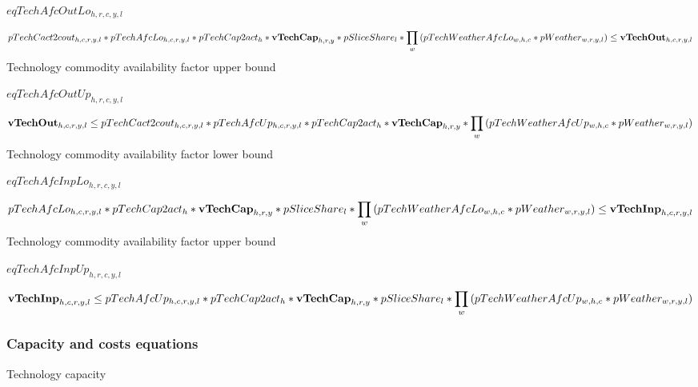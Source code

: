 \documentclass{article}
\begin{document}
$eqTechAfcOutLo_{h,r,c,y,l}$





\begin{dmath} 
pTechCact2cout_{h,c,r,y,l}*pTechAfcLo_{h,c,r,y,l}*pTechCap2act_{h}*{\bf vTechCap}_{h,r,y}*pSliceShare_{l}*\prod_{w}{\left(pTechWeatherAfcLo_{w,h,c}*pWeather_{w,r,y,l}\right)}  \le  {\bf vTechOut}_{h,c,r,y,l}
\end{dmath} 
Technology commodity availability factor upper bound







$eqTechAfcOutUp_{h,r,c,y,l}$





\begin{dmath} 
{\bf vTechOut}_{h,c,r,y,l}  \le  pTechCact2cout_{h,c,r,y,l}*pTechAfcUp_{h,c,r,y,l}*pTechCap2act_{h}*{\bf vTechCap}_{h,r,y}*\prod_{w}{\left(pTechWeatherAfcUp_{w,h,c}*pWeather_{w,r,y,l}\right)}
\end{dmath} 
Technology commodity availability factor lower bound







$eqTechAfcInpLo_{h,r,c,y,l}$





\begin{dmath} 
pTechAfcLo_{h,c,r,y,l}*pTechCap2act_{h}*{\bf vTechCap}_{h,r,y}*pSliceShare_{l}*\prod_{w}{\left(pTechWeatherAfcLo_{w,h,c}*pWeather_{w,r,y,l}\right)}  \le  {\bf vTechInp}_{h,c,r,y,l}
\end{dmath} 
Technology commodity availability factor upper bound







$eqTechAfcInpUp_{h,r,c,y,l}$





\begin{dmath} 
{\bf vTechInp}_{h,c,r,y,l}  \le  pTechAfcUp_{h,c,r,y,l}*pTechCap2act_{h}*{\bf vTechCap}_{h,r,y}*pSliceShare_{l}*\prod_{w}{\left(pTechWeatherAfcUp_{w,h,c}*pWeather_{w,r,y,l}\right)}
\end{dmath} 
\subsubsection*{Capacity and costs equations}
Technology capacity
\end{document}
